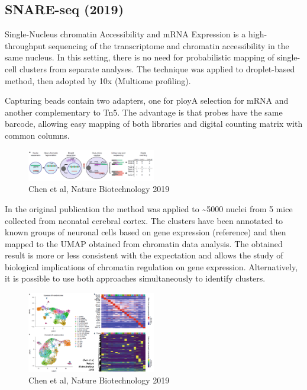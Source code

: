 \hypertarget{snare-seq-2019}{%
\subsection{SNARE-seq (2019)}\label{snare-seq-2019}}

Single-Nucleus chromatin Accessibility and mRNA Expression is a
high-throughput sequencing of the transcriptome and chromatin
accessibility in the same nucleus. In this setting, there is no need for
probabilistic mapping of single-cell clusters from separate analyses.
The technique was applied to droplet-based method, then adopted by 10x
(Multiome profiling).

Capturing beads contain two adapters, one for ployA selection for mRNA
and another complementary to Tn5. The advantage is that probes have the
same barcode, allowing easy mapping of both libraries and digital
counting matrix with common columns.

\begin{figure}
\centering
\includegraphics[width=0.5\textwidth]{images/Screenshot_9.png}
\caption{Chen et al, Nature Biotechnology 2019}
\end{figure}


In the original publication the method was applied to
\textasciitilde5000 nuclei from 5 mice collected from neonatal cerebral
cortex. The clusters have been annotated to known groups of neuronal
cells based on gene expression (reference) and then mapped to the UMAP
obtained from chromatin data analysis. The obtained result is more or
less consistent with the expectation and allows the study of biological
implications of chromatin regulation on gene expression. Alternatively,
it is possible to use both approaches simultaneously to identify
clusters.

\begin{figure}
\centering
\includegraphics[width=0.5\textwidth]{images/Screenshot_10.png}
\caption{Chen et al, Nature Biotechnology 2019}
\end{figure}

